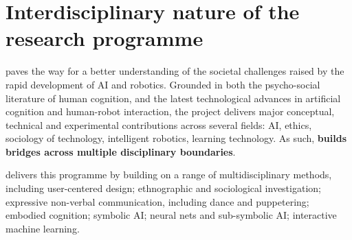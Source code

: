 %
%
%
%
%

\section{Interdisciplinary nature of the research programme}

\project paves the way for a better understanding of the societal challenges
raised by the rapid development of AI and robotics. Grounded in both the
psycho-social literature of human cognition, and the latest technological
advances in artificial cognition and human-robot interaction, the project
delivers major conceptual, technical and experimental contributions across
several fields: AI, ethics, sociology of technology, intelligent robotics,
learning technology. As such, \textbf{\project builds bridges across
multiple disciplinary boundaries}.

\project delivers this programme by building on a range of multidisciplinary
methods, including user-centered design; ethnographic and sociological
investigation; expressive non-verbal communication, including dance and
puppetering; embodied cognition; symbolic AI; neural
nets and sub-symbolic AI; interactive machine learning.

